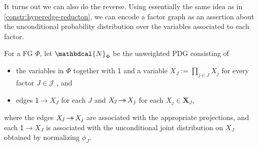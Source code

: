 \documentclass[letterpaper]{article} %
\theoremstyle{plain}
\theoremstyle{definition}
\theoremstyle{remark}
\newcommand\mat[1]{\mathbf{#1}}
\newcommand{\tto}{\rightarrow\mathrel{\mspace{-15mu}}\rightarrow}
\newcommand{\bp}[1][L]{\mat{p}_{\!_{#1}\!}}
\newcommand{\dg}[1]{\mathbdcal{#1}}
\newcommand{\var}[1]{\mathsf{#1}}
\newcommand{\PDGof}[1]{{\dg M}_{#1}}
\newcommand{\UPDGof}[1]{{\dg N}_{#1}}
\begin{document}
It turns out we can also do the reverse. 
Using essentially the same idea as in \cref{constr:hyperedge-reducton},
we can encode a factor graph as an assertion about the unconditional
probability distribution over the variables associated to each
factor.  

\begin{defn} \label{def:fg2PDG}
For a FG $\Phi$, let $\UPDGof{\Phi}$ be
the unweighted PDG consisting of
\begin{itemize}
	\item the variables in $\Phi$ together
   with $\var 1$ and a variable $X_{\!J} := \prod_{j \in J} X_j$ for every factor $J \in \mathcal J$%
   , and
   \item edges ${\var 1} \!\to\! X_{\!J}$ for each $J$ and $X_{\!J} \!\tto\! X_j$ for each $X_j \in \mat X_J$,
\end{itemize}
where the edges $ X_{\!J} \!\tto\! X_j$ are associated with the appropriate projections, and each ${\var 1} \!\to\! X_{\!J}$ is associated with the unconditional joint distribution on $X_J$ obtained by normalizing $\phi_J$.

\end{defn}
\end{document}
